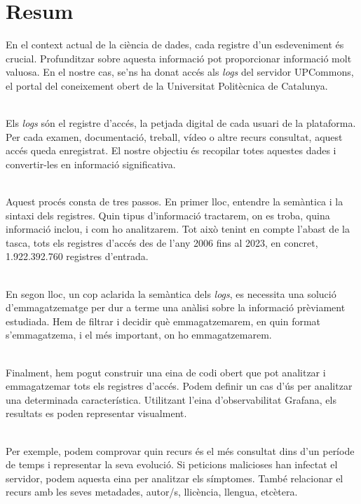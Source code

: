 \chapter*{Resum}\label{ch:abstract-ca}

En el context actual de la ciència de dades, cada registre d'un esdeveniment és crucial.
Profunditzar sobre aquesta informació pot proporcionar informació molt valuosa.
En el nostre cas, se'ns ha donat accés als \textit{\gls{log}s} del servidor UPCommons, el portal del coneixement obert de la Universitat Politècnica de Catalunya.

\noindent \\
Els \textit{\gls{log}s} són el registre d'accés, la petjada digital de cada usuari de la plataforma.
Per cada examen, documentació, treball, vídeo o altre recurs consultat, aquest accés queda enregistrat.
El nostre objectiu és recopilar totes aquestes dades i convertir-les en informació significativa.

\noindent \\
Aquest procés consta de tres passos.
En primer lloc, entendre la semàntica i la sintaxi dels registres.
Quin tipus d'informació tractarem, on es troba, quina informació inclou, i com ho analitzarem.
Tot això tenint en compte l'abast de la tasca, tots els registres d'accés des de l'any 2006 fins al 2023, en concret, 1.922.392.760 registres d'entrada.

\noindent \\
En segon lloc, un cop aclarida la semàntica dels \textit{\gls{log}s}, es necessita una solució d'emmagatzematge per dur a terme una anàlisi sobre la informació prèviament estudiada.
Hem de filtrar i decidir què emmagatzemarem, en quin format s'emmagatzema, i el més important, on ho emmagatzemarem.

\noindent \\
Finalment, hem pogut construir una eina de codi obert que pot analitzar i emmagatzemar tots els registres d'accés.
Podem definir un cas d'ús per analitzar una determinada característica.
Utilitzant l'eina d'observabilitat Grafana, els resultats es poden representar visualment.

\noindent \\
Per exemple, podem comprovar quin recurs és el més consultat dins d'un període de temps i representar la seva evolució.
Si peticions malicioses han infectat el servidor, podem aquesta eina per analitzar els símptomes.
També relacionar el recurs amb les seves metadades, autor/s, llicència, llengua, etcètera.


